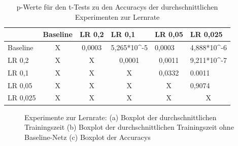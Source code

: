 \begin{table}[]
\caption{p-Werte für den t-Tests zu den Accuracys der durchschnittlichen Experimenten zur Lernrate}
\begin{tabular}{l|c|c|c|c|l|}
\cline{2-6}
                               & \multicolumn{1}{l|}{Baseline} & \multicolumn{1}{l|}{LR 0,2} & \multicolumn{1}{l|}{LR 0,1}                       & \multicolumn{1}{l|}{LR 0,05} & LR 0,025                       \\ \hline
\multicolumn{1}{|l|}{Baseline} & X                             & 0,0003                      & \multicolumn{1}{l|}{5,265*10\textasciicircum{}-5} & \multicolumn{1}{l|}{0,0003}  & 4,888*10\textasciicircum{}-6   \\ \hline
\multicolumn{1}{|l|}{LR 0,2}   & X                             & X                           & 0,0001                                            & 0,0011                       & 9,211*10\textasciicircum{}-7   \\ \hline
\multicolumn{1}{|l|}{LR 0,1}   & X                             & X                           & X                                                 & 0,0332                       & 0.0011                         \\ \hline
\multicolumn{1}{|l|}{LR 0,05}  & X                             & X                           & X                                                 & X                            & \cellcolor[HTML]{FE0000}0,9074 \\ \hline
\multicolumn{1}{|l|}{LR 0,025} & X                             & X                           & X                                                 & X                            & \multicolumn{1}{c|}{X}         \\ \hline
\end{tabular}
\label{tab:lr1}
\end{table}
 
 \begin{figure}
     \centering
     \hfill
     \caption{Experimente zur Lernrate: (a) Boxplot der durchschnittlichen Trainingszeit (b) Boxplot der durchschnittlichen Trainingszeit ohne Baseline-Netz (c) Boxplot der Accuracys}
     \label{abb:lr}
\end{figure}

